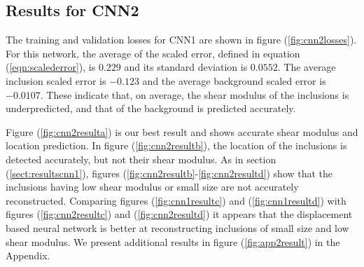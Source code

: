 \documentclass[12pt]{article}
\begin{document}
\subsection{\label{sect:resultscnn2}Results for CNN2}
The training and validation losses for CNN1 are shown in figure (\ref{fig:cnn2losses}). For this network, the average of the scaled error, defined in equation (\ref{eqn:scalederror}), is $0.229$ and its standard deviation is $0.0552$. The average inclusion scaled error is $-0.123$ and the average background scaled error is $-0.0107$. These indicate that, on average, the shear modulus of the inclusions is underpredicted, and that of the background is predicted accurately.

Figure (\ref{fig:cnn2resulta}) is our best result and shows accurate shear modulus and location prediction. In figure (\ref{fig:cnn2resultb}), the location of the inclusions is detected accurately, but not their shear modulus. As in section (\ref{sect:resultscnn1}), figures (\ref{fig:cnn2resultb}-\ref{fig:cnn2resultd}) show that the inclusions having low shear modulus or small size are not accurately reconstructed. Comparing figures (\ref{fig:cnn1resultc}) and (\ref{fig:cnn1resultd}) with figures (\ref{fig:cnn2resultc}) and (\ref{fig:cnn2resultd}) it appears that the displacement based neural network is better at reconstructing inclusions of small size and low shear modulus. We present additional results in figure (\ref{fig:app2result}) in the Appendix.
\end{document}
